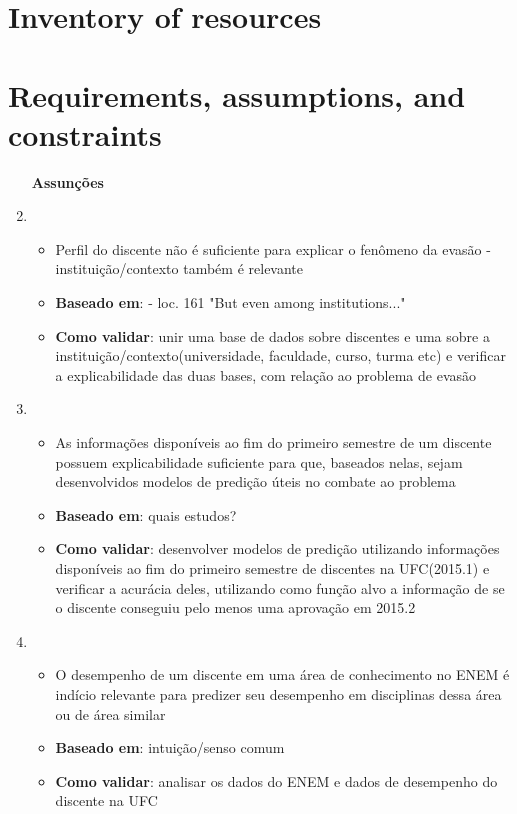 \documentclass{report}
\begin{document}
\listoftodos

\tableofcontents

\chapter{Inventory of resources}

\chapter{Requirements, assumptions, and constraints}

\begin{enumerate}
\item [\textbf{Assunções}]
\item 
	\begin{itemize}
	\item Perfil do discente não é suficiente para explicar o fenômeno da evasão - instituição/contexto também é relevante
	\item \textbf{Baseado em}: \cite{tinto_completing} - loc. 161 "But even among institutions..."
	\item \textbf{Como validar}: unir uma base de dados sobre discentes e uma sobre a instituição/contexto(universidade, faculdade, curso, turma etc) e verificar a explicabilidade das duas bases, com relação ao problema de evasão
	\end{itemize}

\item 
	\begin{itemize}
	\item As informações disponíveis ao fim do primeiro semestre de um discente possuem explicabilidade suficiente para que, baseados nelas, sejam desenvolvidos modelos de predição úteis no combate ao problema
	\item \textbf{Baseado em}: quais estudos? \cite{tinto_completing} 
	\item \textbf{Como validar}: desenvolver modelos de predição utilizando informações disponíveis ao fim do primeiro semestre de discentes na UFC(2015.1) e verificar a acurácia deles, utilizando como função alvo a informação de se o discente conseguiu pelo menos uma aprovação em 2015.2
	\end{itemize}

\item 
	\begin{itemize}
	\item O desempenho de um discente em uma área de conhecimento no ENEM é indício relevante para predizer seu desempenho em disciplinas dessa área ou de área similar
	\item \textbf{Baseado em}: intuição/senso comum
	\item \textbf{Como validar}: analisar os dados do ENEM e dados de desempenho do discente na UFC
	\end{itemize}
	

\end{enumerate}
\end{document}
